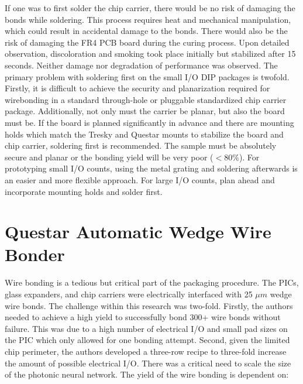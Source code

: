 \qquad If one was to first solder the chip carrier, there would be no risk of damaging the bonds while soldering. This process requires heat and mechanical manipulation, which could result in accidental damage to the bonds. There would also be the risk of damaging the FR4 PCB board during the curing process. Upon detailed observation, discoloration and smoking took place initially but stabilized after 15 seconds. Neither damage nor degradation of performance was observed. The primary problem with soldering first on the small I/O DIP packages is twofold. Firstly, it is difficult to achieve the security and planarization required for wirebonding in a standard through-hole or pluggable standardized chip carrier package. Additionally, not only must the carrier be planar, but also the board must be. If the board is planned significantly in advance and there are mounting holds which match the Tresky and Questar mounts to stabilize the board and chip carrier, soldering first is recommended. The sample must be absolutely secure and planar or the bonding yield will be very poor ($< 80\%$). For prototyping small I/O counts, using the metal grating and soldering afterwards is an easier and more flexible approach. For large I/O counts, plan ahead and incorporate mounting holds and solder first. 

\section{Questar Automatic Wedge Wire Bonder}
\qquad Wire bonding is a tedious but critical part of the packaging procedure. The PICs, glass expanders, and chip carriers were electrically interfaced with 25 $\mu m$ wedge wire bonds. The challenge within this research was two-fold. Firstly, the authors needed to achieve a high yield to successfully bond 300+ wire bonds without failure. This was due to a high number of electrical I/O and small pad sizes on the PIC which only allowed for one bonding attempt. Second, given the limited chip perimeter, the authors developed a three-row recipe to three-fold increase the amount of possible electrical I/O. There was a critical need to scale the size of the photonic neural network. The yield of the wire bonding is dependent on:

